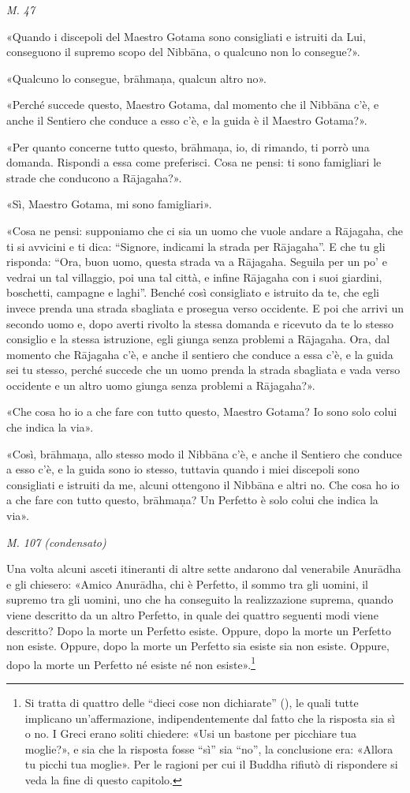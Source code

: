 \emph{M. 47}


«Quando i discepoli del Maestro Gotama sono consigliati e istruiti da
Lui, conseguono il supremo scopo del Nibbāna, o qualcuno non lo
consegue?».


«Qualcuno lo consegue, brāhmaṇa, qualcun altro no».


«Perché succede questo, Maestro Gotama, dal momento che il Nibbāna c’è,
e anche il Sentiero che conduce a esso c’è, e la guida è il Maestro
Gotama?».


«Per quanto concerne tutto questo, brāhmaṇa, io, di rimando, ti porrò
una domanda. Rispondi a essa come preferisci. Cosa ne pensi: ti sono
famigliari le strade che conducono a Rājagaha?».


«Sì, Maestro Gotama, mi sono famigliari».


«Cosa ne pensi: supponiamo che ci sia un uomo che vuole andare a
Rājagaha, che ti si avvicini e ti dica: “Signore, indicami la strada per
Rājagaha”. E che tu gli risponda: “Ora, buon uomo, questa strada va a
Rājagaha. Seguila per un po’ e vedrai un tal villaggio, poi una tal
città, e infine Rājagaha con i suoi giardini, boschetti, campagne e
laghi”. Benché così consigliato e istruito da te, che egli invece prenda
una strada sbagliata e prosegua verso occidente. E poi che arrivi un
secondo uomo e, dopo averti rivolto la stessa domanda e ricevuto da te
lo stesso consiglio e la stessa istruzione, egli giunga senza problemi a
Rājagaha. Ora, dal momento che Rājagaha c’è, e anche il sentiero che
conduce a essa c’è, e la guida sei tu stesso, perché succede che un uomo
prenda la strada sbagliata e vada verso occidente e un altro uomo giunga
senza problemi a Rājagaha?».


«Che cosa ho io a che fare con tutto questo, Maestro Gotama? Io sono
solo colui che indica la via».


«Così, brāhmaṇa, allo stesso modo il Nibbāna c’è, e anche il Sentiero
che conduce a esso c’è, e la guida sono io stesso, tuttavia quando i
miei discepoli sono consigliati e istruiti da me, alcuni ottengono il
Nibbāna e altri no. Che cosa ho io a che fare con tutto questo,
brāhmaṇa? Un Perfetto è solo colui che indica la via».


\emph{M. 107 (condensato)}


Una volta alcuni asceti itineranti di altre sette andarono dal
venerabile Anurādha e gli chiesero: «Amico Anurādha, chi è Perfetto, il
sommo tra gli uomini, il supremo tra gli uomini, uno che ha conseguito
la realizzazione suprema, quando viene descritto da un altro Perfetto,
in quale dei quattro seguenti modi viene descritto? Dopo la morte un
Perfetto esiste. Oppure, dopo la morte un Perfetto non esiste. Oppure,
dopo la morte un Perfetto sia esiste sia non esiste. Oppure, dopo la
morte un Perfetto né esiste né non esiste».\footnote{Si tratta di quattro delle “dieci cose non dichiarate” (\hyperlink{cap-12-La-Dottrina#pag230}{}), le quali tutte implicano un’affermazione, indipendentemente dal fatto che la risposta sia sì o no. I Greci erano soliti chiedere: «Usi un bastone per picchiare tua moglie?», e sia che la risposta fosse “sì” sia “no”, la conclusione era: «Allora tu picchi tua moglie». Per le ragioni per cui il Buddha rifiutò di rispondere si veda la fine di questo capitolo.}



